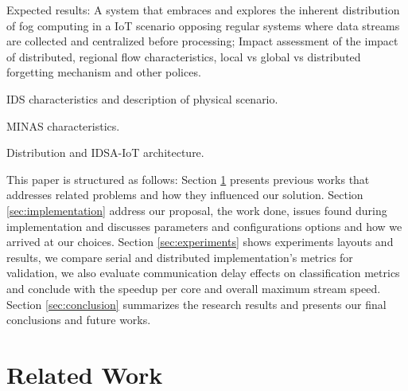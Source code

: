 \documentclass[conference]{IEEEtran}
\begin{document}


Expected results:
A system that embraces and explores the inherent distribution of fog computing
in a IoT scenario opposing regular systems where data streams are collected and
centralized before processing;
Impact assessment of the impact of distributed, regional flow characteristics,
local vs global vs distributed forgetting mechanism and other polices.

IDS characteristics and description of physical scenario.

MINAS characteristics.

Distribution and IDSA-IoT architecture.

This paper is structured as follows:
Section \ref{sec:related} presents previous works that addresses related
problems and how they influenced our solution.
Section \ref{sec:implementation} address our proposal, the work done, issues
found during implementation and discusses parameters and configurations options
and how we arrived at our choices.
Section \ref{sec:experiments} shows experiments layouts and results, we
compare serial and distributed implementation's metrics for validation,
we also evaluate communication delay effects on classification metrics and
conclude with the speedup per core and overall maximum stream speed.
Section \ref{sec:conclusion} summarizes the research results and presents our
final conclusions and future works.


\section{Related Work}\label{sec:related}
\end{document}
